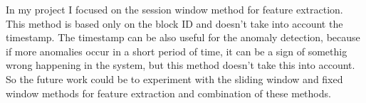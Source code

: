 In my project I focused on the session window method for feature extraction. This method is based only on the block ID and doesn't take into account the timestamp. 
The timestamp can be also useful for the anomaly detection, because if more anomalies occur in a short period of time, it can be a sign of somethig wrong happening in the system, but this method doesn't take this into account. 
So the future work could be to experiment with the sliding window and fixed window methods for feature extraction and combination of these methods.


% 